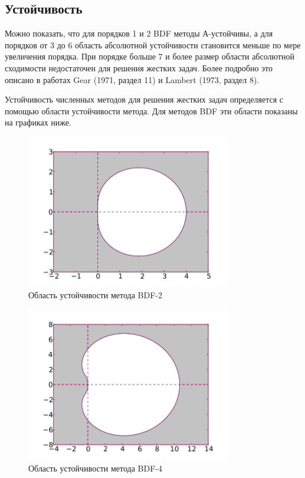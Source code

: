 \documentclass[12pt, a4paper]{article}
\begin{document}
\subsection{Устойчивость}

Можно показать, что для порядков 1 и 2 BDF методы А-устойчивы, а для порядков от 3 до 6 область абсолютной устойчивости становится меньше по мере увеличения порядка. При порядке больше 7 и более размер области абсолютной сходимости недостаточен для решения жестких задач. Более подробно это описано в работах Gear (1971, раздел 11) и Lambert (1973, раздел 8).

Устойчивость численных методов для решения жестких задач определяется с помощью области устойчивости метода. Для методов BDF эти области показаны на графиках ниже.

\begin{figure}[!htbp]
	\centering
	\includegraphics[width=0.8\textwidth]{330px-Stability_region_for_BDF2}%
	\caption{Область устойчивости метода BDF-2~\cite{intr-cambridge}}
	\vspace*{-2mm}
	\label{ser_graph}
\end{figure}

\begin{figure}[!htbp]
	\centering
	\includegraphics[width=0.8\textwidth]{330px-Stability_region_for_BDF4}%
	\caption{Область устойчивости метода BDF-4~\cite{intr-cambridge}}
	\vspace*{-2mm}
	\label{ser_graph}
\end{figure}
\end{document}
